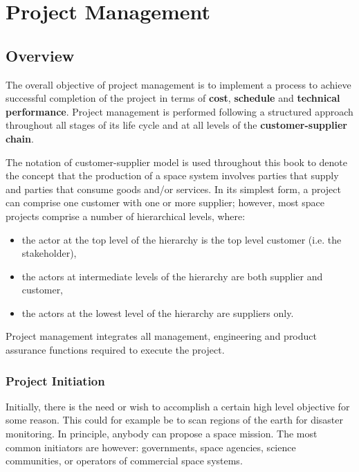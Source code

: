\chapter{Project Management}

\section{Overview}

The overall objective of project management is to implement a process to achieve successful completion of the project in terms of \textbf{cost}, \textbf{schedule} and \textbf{technical performance}. Project management is performed following a structured approach throughout all stages of its life cycle and at all levels of the \textbf{customer-supplier chain}.

The notation of customer-supplier model is used throughout this book to denote the concept that  the production of a space system involves parties that supply and parties that consume goods and/or services. In its simplest form, a project can comprise one customer with one or more supplier; however, most space projects comprise a number of hierarchical levels, where:

\begin{itemize}
\item the actor at the top level of the hierarchy is the top level customer (i.e. the stakeholder),
\item the actors at intermediate levels of the hierarchy are both supplier and
customer,
\item the actors at the lowest level of the hierarchy are suppliers only.
\end{itemize}

Project management integrates all management, engineering and product assurance functions required to execute the project.

\subsection{Project Initiation} 

Initially, there is the need or wish to accomplish a certain high level objective for some reason. This could for example be to scan regions of the earth for disaster monitoring. In principle, anybody can propose a space mission. The most common initiators are however: governments, space agencies, science communities, or operators of commercial space systems.

